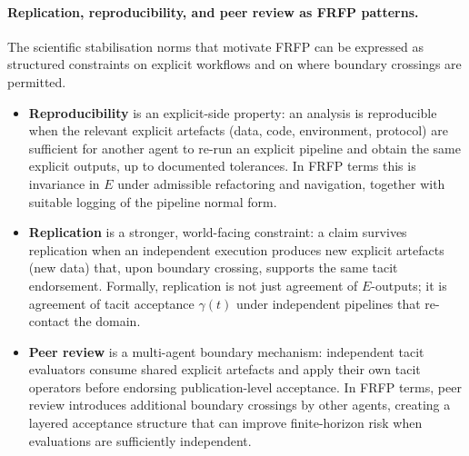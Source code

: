 \paragraph{Replication, reproducibility, and peer review as FRFP patterns.}
The scientific stabilisation norms that motivate FRFP can be expressed as structured constraints on explicit workflows and on where boundary crossings are permitted.
\begin{itemize}[leftmargin=2em]
  \item \textbf{Reproducibility} is an explicit-side property: an analysis is reproducible when the relevant explicit artefacts (data, code, environment, protocol) are sufficient for another agent to re-run an explicit pipeline and obtain the same explicit outputs, up to documented tolerances. In FRFP terms this is invariance in \(E\) under admissible refactoring and navigation, together with suitable logging of the pipeline normal form.
  \item \textbf{Replication} is a stronger, world-facing constraint: a claim survives replication when an independent execution produces new explicit artefacts (new data) that, upon boundary crossing, supports the same tacit endorsement. Formally, replication is not just agreement of \(E\)-outputs; it is agreement of tacit acceptance \(\gamma(t)\) under independent pipelines that re-contact the domain.
  \item \textbf{Peer review} is a multi-agent boundary mechanism: independent tacit evaluators consume shared explicit artefacts and apply their own tacit operators before endorsing publication-level acceptance. In FRFP terms, peer review introduces additional boundary crossings by other agents, creating a layered acceptance structure that can improve finite-horizon risk when evaluations are sufficiently independent.
\end{itemize}

